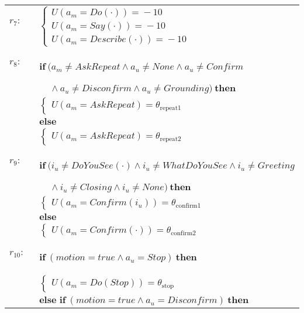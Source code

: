 \begin{footnotesize}
\begin{longtable}{p{2cm}l}
$r_{7}$: \ \ & \;\;\;\;\; $ \begin{cases}U(\mathit{a_m}\!=\!\mathit{Do(\cdot)})\!=\!-10 \\
U(\mathit{a_m}\!=\!\mathit{Say(\cdot)})\!=\!-10 \\
U(\mathit{a_m}\!=\!\mathit{Describe(\cdot)})\!=\!-10 \end{cases}$ \\ \\[-2mm]
$r_{8}$: \ \ & $ \textbf{if} \ (\mathit{a_m}\!\neq\!\mathit{AskRepeat} \land \mathit{a_u}\!\neq\!\mathit{None} \land \mathit{a_u}\!\neq\!\mathit{Confirm} $ \\ & $\ \ \ \ \  \land \mathit{a_u}\!\neq\!\mathit{Disconfirm} \land \mathit{a_u}\!\neq\!\mathit{Grounding}) \ \textbf{then} $ \\
 & \;\;\;\;\; $ \begin{cases}U(\mathit{a_m}\!=\!\mathit{AskRepeat})\!=\!\theta_{\mathrm{repeat1}} \end{cases}$\\[3mm] & $ \textbf{else}$ \\
& \;\;\;\;\; $ \begin{cases}U(\mathit{a_m}\!=\!\mathit{AskRepeat})\!=\!\theta_{\mathrm{repeat2}} \end{cases}$ \\ \\[-2mm]
$r_{9}$: \ \ & $ \textbf{if} \ (\mathit{i_u}\!\neq\!\mathit{DoYouSee(\cdot)} \land \mathit{i_u}\!\neq\!\mathit{WhatDoYouSee} \land \mathit{i_u}\!\neq\!\mathit{Greeting} $ \\ & $\ \ \ \ \ \land \mathit{i_u}\!\neq\!\mathit{Closing} \land \mathit{i_u}\!\neq\!\mathit{None}) \ \textbf{then} $ \\
 & \;\;\;\;\; $ \begin{cases}U(\mathit{a_m}\!=\!\mathit{Confirm({i_u})})\!=\!\theta_{\mathrm{confirm1}} \end{cases}$\\[3mm] & $ \textbf{else}$ \\
& \;\;\;\;\; $ \begin{cases}U(\mathit{a_m}\!=\!\mathit{Confirm(\cdot)})\!=\!\theta_{\mathrm{confirm2}} \end{cases}$ \\ \\[-2mm]
$r_{10}$: \ \ & $ \textbf{if} \ (\mathit{motion}\!=\!\mathit{true} \land \mathit{a_u}\!=\!\mathit{Stop}) \ \textbf{then} $ \\
 & \;\;\;\;\; $ \begin{cases}U(\mathit{a_m}\!=\!\mathit{Do(Stop)})\!=\!\theta_{\mathrm{stop}} \end{cases}$\\[3mm] & $ \textbf{else if} \ (\mathit{motion}\!=\!\mathit{true} \land \mathit{a_u}\!=\!\mathit{Disconfirm}) \ \textbf{then}$ \\

\end{longtable}
\end{footnotesize}
